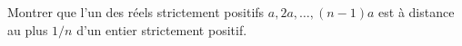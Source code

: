 Montrer que l'un des réels strictement positifs $a, 2a, \ldots, (n - 1)a$ est à distance au plus $1/n$ d'un entier strictement positif.
